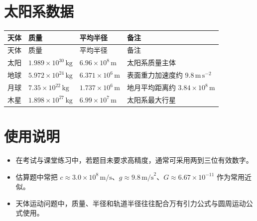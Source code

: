 \section{太阳系数据}

\begin{longtable}{p{}p{}p{}p{}}
\toprule
天体 & 质量 & 平均半径 & 备注 \\
\midrule
\endfirsthead

\toprule
天体 & 质量 & 平均半径 & 备注 \\
\midrule
\endhead

\bottomrule
\endfoot

太阳 & $1.989\times 10^{30}\,\text{kg}$ & $6.96\times 10^8\,\text{m}$ & 太阳系质量主体 \\
地球 & $5.972\times 10^{24}\,\text{kg}$ & $6.371\times 10^6\,\text{m}$ & 表面重力加速度约 $9.8\,\text{m}\,\text{s}^{-2}$ \\
月球 & $7.35\times 10^{22}\,\text{kg}$ & $1.737\times 10^6\,\text{m}$ & 地月平均距离约 $3.84\times 10^8\,\text{m}$ \\
木星 & $1.898\times 10^{27}\,\text{kg}$ & $6.99\times 10^7\,\text{m}$ & 太阳系最大行星 \\
\end{longtable}

\section{使用说明}

\begin{itemize}
  \item 在考试与课堂练习中，若题目未要求高精度，通常可采用两到三位有效数字。
  \item 估算题中常把 $c\approx 3.0\times 10^8\,\text{m/s}$、$g\approx 9.8\,\text{m/s}^2$、$G\approx 6.67\times 10^{-11}$ 作为常用近似。
  \item 天体运动问题中，质量、半径和轨道半径往往配合万有引力公式与圆周运动公式使用。
\end{itemize}
